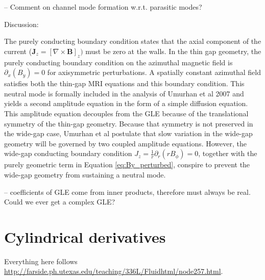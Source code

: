 \documentclass{paper}
\newcommand\reym{\mathrm{Rm}}
\begin{document}
-- Comment on channel mode formation w.r.t. parasitic modes?

Discussion:



The purely conducting boundary condition states that the axial component of the current ($\mathbf{J}_z = [\nabla \times \mathbf{B}]_z)$ must be zero at the walls. In the thin gap geometry, the purely conducting boundary condition on the azimuthal magnetic field is $\partial_x(B_y) = 0$ for axisymmetric perturbations. A spatially constant azimuthal field satisfies both the thin-gap MRI equations and this boundary condition. This neutral mode is formally included in the analysis of Umurhan et al 2007 and yields a second amplitude equation in the form of a simple diffusion equation. This amplitude equation decouples from the GLE because of the translational symmetry of the thin-gap geometry. Because that symmetry is not preserved in the wide-gap case, Umurhan et al postulate that slow variation in the wide-gap geometry will be governed by two coupled amplitude equations. However, the wide-gap conducting boundary condition $J_z = \frac{1}{r} \partial_r (r B_\phi) = 0$, together with the purely geometric term in Equation \ref{eq:By_perturbed}, conspire to prevent the wide-gap geometry from sustaining a neutral mode.

-- coefficients of GLE come from inner products, therefore must always be real. Could we ever get a complex GLE?

\appendix

\section{Cylindrical derivatives}
\label{sec:cylindrical_deriv}

Everything here follows \url{http://farside.ph.utexas.edu/teaching/336L/Fluidhtml/node257.html}.
\end{document}
